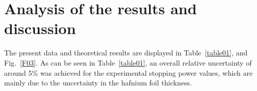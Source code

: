 \documentclass[aps,pra,reprint,groupedaddress,showpacs,showkeys]{revtex4-1} %
\begin{document}
\section{Analysis of the results and discussion}
\label{discussion}

The present data and theoretical results are displayed in 
Table~\ref{table01}, and Fig.~\ref{F03}. As can be seen in 
Table~\ref{table01}, an overall relative uncertainty of around 5\% was 
achieved for the experimental stopping power values, which are mainly 
due to the uncertainty in the hafnium foil thickness. 
\end{document}
